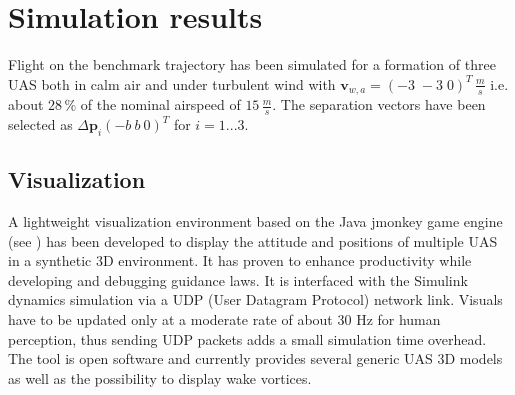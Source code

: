 \documentclass{ifacconf}
\newcommand{\mbf}[1]{\mathbf{#1}}
\providecommand{\mbf}[1]{\mathbf{#1}}
\begin{document}
\section{Simulation results}
\label{sec:simresults}
Flight on the benchmark trajectory has been simulated for a formation of three UAS both in calm air and under turbulent wind with $\mbf{v}_{w,a} = (-3 \; -3 \; 0)^T \, \frac{m}{s}$ i.e. about $28 \, \%$ of the nominal airspeed of $15 \, \frac{m}{s}$. The separation vectors have been selected as $\Delta \mbf{p}_i (-b \: b \: 0)^T$ for $i=1...3$.
\subsection{Visualization}
A lightweight visualization environment based on the Java jmonkey game engine (see \cite{jmonkeyengine}) has been developed to display the attitude and positions of multiple UAS in a synthetic 3D environment. 
It has proven to enhance productivity while developing and debugging guidance laws. 
It is interfaced with the Simulink dynamics simulation via a UDP (User Datagram Protocol) network link. Visuals have to be updated only at a moderate rate of about 30 Hz for human perception, thus sending UDP packets adds a small simulation time overhead. The tool is open software and currently provides several generic UAS 3D models as well as the possibility to display wake vortices.
\end{document}
